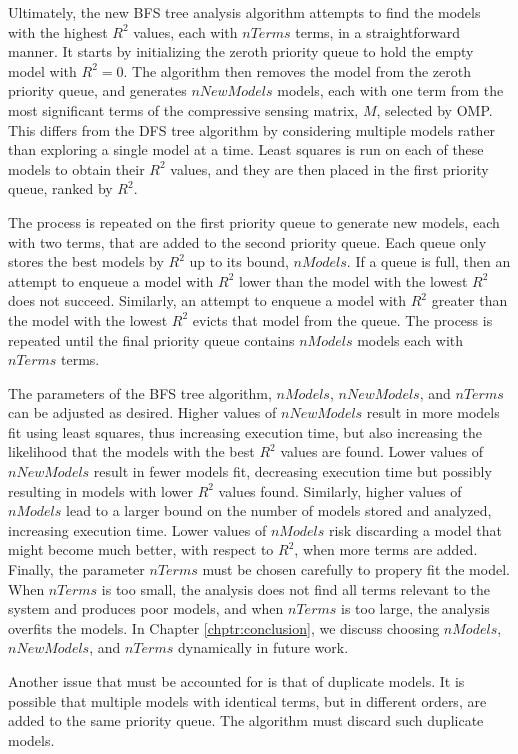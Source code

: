 Ultimately, the new BFS tree analysis algorithm attempts to find the models with the highest $R^2$ values, each with $nTerms$ terms, in a straightforward manner.
It starts by initializing the zeroth priority queue to hold the empty model with $R^2 = 0$. 
The algorithm then removes the model from the zeroth priority queue, and generates $nNewModels$ models, each with one term from the most significant terms of the compressive sensing matrix, $M$, selected by OMP. 
This differs from the DFS tree algorithm by considering multiple models rather than exploring a single model at a time.
Least squares is run on each of these models to obtain their $R^2$ values, and they are then placed in the first priority queue, ranked by $R^2$. 

The process is repeated on the first priority queue to generate new models, each with two terms, that are added to the second priority queue. 
Each queue only stores the best models by $R^2$ up to its bound, $nModels$.
If a queue is full, then an attempt to enqueue a model with $R^2$ lower than the model with the lowest $R^2$ does not succeed.
Similarly, an attempt to enqueue a model with $R^2$ greater than the model with the lowest $R^2$ evicts that model from the queue. 
The process is repeated until the final priority queue contains $nModels$ models each with $nTerms$ terms.
 
The parameters of the BFS tree algorithm, $nModels$, $nNewModels$, and $nTerms$ can be adjusted as desired.
Higher values of $nNewModels$ result in more models fit using least squares, thus increasing execution time, but also increasing the likelihood that the models with the best $R^2$ values are found. 
Lower values of $nNewModels$ result in fewer models fit, decreasing execution time but possibly resulting in models with lower $R^2$ values found.
Similarly, higher values of $nModels$ lead to a larger bound on the number of models stored and analyzed, increasing execution time. 
Lower values of $nModels$ risk discarding a model that might become much better, with respect to $R^2$, when more terms are added.
Finally, the parameter $nTerms$ must be chosen carefully to propery fit the model.
When $nTerms$ is too small, the analysis does not find all terms relevant to the system and produces poor models, and when $nTerms$ is too large, the analysis overfits the models.
In Chapter \ref{chptr:conclusion}, we discuss choosing $nModels$, $nNewModels$, and $nTerms$ dynamically in future work.

Another issue that must be accounted for is that of duplicate models. 
It is possible that multiple models with identical terms, but in different orders, are added to the same priority queue. 
The algorithm must discard such duplicate models. %

